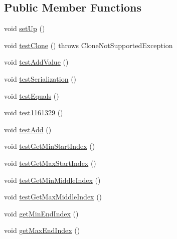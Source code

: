 \subsection*{Public Member Functions}
\begin{DoxyCompactItemize}
\item 
void \mbox{\hyperlink{classorg_1_1jfree_1_1data_1_1time_1_1_time_period_values_test_a9e4f54ddedb18eafc36069ef0de0474c}{set\+Up}} ()
\item 
void \mbox{\hyperlink{classorg_1_1jfree_1_1data_1_1time_1_1_time_period_values_test_ac16eda32cd90430ac1a7d2f7bb444b4a}{test\+Clone}} ()  throws Clone\+Not\+Supported\+Exception 
\item 
void \mbox{\hyperlink{classorg_1_1jfree_1_1data_1_1time_1_1_time_period_values_test_accd22114674d5e9ff6301883466f21ab}{test\+Add\+Value}} ()
\item 
void \mbox{\hyperlink{classorg_1_1jfree_1_1data_1_1time_1_1_time_period_values_test_aec4bbc4ed15c4c6e9972c25fa5e04365}{test\+Serialization}} ()
\item 
void \mbox{\hyperlink{classorg_1_1jfree_1_1data_1_1time_1_1_time_period_values_test_a7e175eb34099ae46ec6c94958dea361f}{test\+Equals}} ()
\item 
void \mbox{\hyperlink{classorg_1_1jfree_1_1data_1_1time_1_1_time_period_values_test_a7b1b7ee5bc4c3dda177d5dbe2de7bf51}{test1161329}} ()
\item 
void \mbox{\hyperlink{classorg_1_1jfree_1_1data_1_1time_1_1_time_period_values_test_a8af8a0ff36f02fb2053595e71e9d1907}{test\+Add}} ()
\item 
void \mbox{\hyperlink{classorg_1_1jfree_1_1data_1_1time_1_1_time_period_values_test_a197139bdcfc7325b7e81f7f856ec62be}{test\+Get\+Min\+Start\+Index}} ()
\item 
void \mbox{\hyperlink{classorg_1_1jfree_1_1data_1_1time_1_1_time_period_values_test_a6da0ecb4e903db1822b695886d50ef5a}{test\+Get\+Max\+Start\+Index}} ()
\item 
void \mbox{\hyperlink{classorg_1_1jfree_1_1data_1_1time_1_1_time_period_values_test_a18fb27c5f6c070859117b70af179188b}{test\+Get\+Min\+Middle\+Index}} ()
\item 
void \mbox{\hyperlink{classorg_1_1jfree_1_1data_1_1time_1_1_time_period_values_test_af8c332328f1ff3f2ee92ed8594a87e59}{test\+Get\+Max\+Middle\+Index}} ()
\item 
void \mbox{\hyperlink{classorg_1_1jfree_1_1data_1_1time_1_1_time_period_values_test_ab99cb1427cd7f8894f005766f2dea114}{get\+Min\+End\+Index}} ()
\item 
void \mbox{\hyperlink{classorg_1_1jfree_1_1data_1_1time_1_1_time_period_values_test_a9ae9e2c523b93570eac5676896d98936}{get\+Max\+End\+Index}} ()
\end{DoxyCompactItemize}


